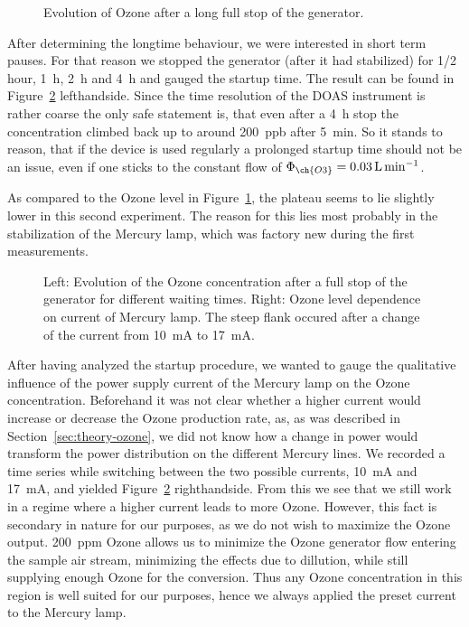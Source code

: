 \begin{figure}[htbp]
  \centering
  
  \caption{Evolution of Ozone after a long full stop of the
    generator.}
  \label{fig:long-stop}
\end{figure}

After determining the longtime behaviour, we were interested in
short term pauses. For that reason we stopped the generator (after it
had stabilized) for {\nfrac{} 1/2} \si{hour}, \SI{1}{\hour},
\SI{2}{\hour} and \SI{4}{\hour} and gauged the startup time. The
result can be found in Figure~\ref{fig:multiple-stop}
lefthandside. Since the time resolution of the DOAS instrument is
rather coarse the only safe statement is, that even after a
\SI{4}{\hour} stop the concentration climbed back up to around
\SI{200}{ppb} after \SI{5}{\minute}. So it stands to reason, that if
the device is used regularly a prolonged startup time should not be an
issue, even if one sticks to the constant flow of $\Phi_{\ch{O3}} =
\SI{0.03}{\liter\per\minute}$.

As compared to the Ozone level in Figure~\ref{fig:long-stop}, the
plateau seems to lie slightly lower in this second experiment. The
reason for this lies most probably in the stabilization of the Mercury
lamp, which was factory new during the first measurements.

\begin{figure}[htbp]
  \centering
  
  \hfill
  
  \caption{Left: Evolution of the Ozone concentration after a full stop of the
    generator for different waiting times. Right: Ozone level
    dependence on current of Mercury lamp. The steep
    flank occured after a change of the current from
    \SI{10}{\milli\ampere} to \SI{17}{\milli\ampere}.}
  \label{fig:multiple-stop}
\end{figure}

After having analyzed the startup procedure, we wanted to gauge the
qualitative influence of the power supply current of the Mercury lamp
on the Ozone concentration. Beforehand it was not clear whether a
higher current would increase or decrease the Ozone production rate,
as, as was described in Section~\ref{sec:theory-ozone}, we did not
know how a change in power would transform the power distribution on
the different Mercury lines. We recorded a time series while switching
between the two possible currents, \SI{10}{\milli\ampere} and
\SI{17}{\milli\ampere}, and yielded Figure~\ref{fig:multiple-stop}
righthandside. From this we see that we still work in a regime where a
higher current leads to more Ozone. However, this fact is secondary in
nature for our purposes, as we do not wish to maximize the Ozone
output. \SI{200}{ppm} Ozone allows us to minimize the Ozone generator
flow entering the sample air stream, minimizing the effects due to
dillution, while still supplying enough Ozone for the conversion. Thus
any Ozone concentration in this region is well suited for our
purposes, hence we always applied the preset current to the Mercury
lamp. 

